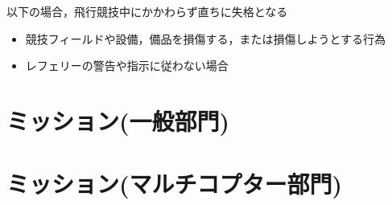 \documentclass[a4paper,12pt,oneside]{jsarticle}
\begin{document}
以下の場合，飛行競技中にかかわらず直ちに失格となる
\begin{itemize}
  \item 競技フィールドや設備，備品を損傷する，または損傷しようとする行為
  \item レフェリーの警告や指示に従わない場合　
\end{itemize}


\section{ミッション(一般部門)}

\section{ミッション(マルチコプター部門)}

\end{document}
